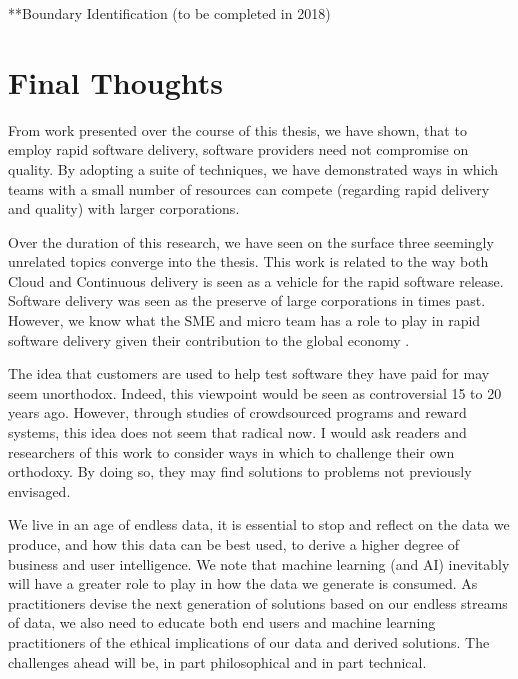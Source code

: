  **Boundary Identification (to be completed in 2018)

\section{Final Thoughts}

From work presented over the course of this thesis, we have shown, that to employ rapid software delivery, software providers need not compromise on quality. By adopting a suite of techniques, we have demonstrated ways in which teams with a small number of resources can compete (regarding rapid delivery and quality) with larger corporations. 

Over the duration of this research, we have seen on the surface three seemingly unrelated topics converge into the thesis. This work is related to the way both Cloud and Continuous delivery is seen as a vehicle for the rapid software release. Software delivery was seen as the preserve of large corporations in times past. However, we know what the SME and micro team has a role to play in rapid software delivery given their contribution to the global economy \cite{WTO}.

The idea that customers are used to help test software they have paid for may seem unorthodox. Indeed, this viewpoint would be seen as controversial 15 to 20 years ago. However, through studies of crowdsourced programs and reward systems, this idea does not seem that radical now. I would ask readers and researchers of this work to consider ways in which to challenge their own orthodoxy. By doing so, they may find solutions to problems not previously envisaged.

We live in an age of endless data, it is essential to stop and reflect on the data we produce, and how this data can be best used, to derive a higher degree of business and user intelligence. We note that machine learning (and AI) inevitably will have a greater role to play in how the data we generate is consumed. As practitioners devise the next generation of solutions based on our endless streams of data, we also need to educate both end users and machine learning practitioners of the ethical implications of our data and derived solutions. The challenges ahead will be, in part philosophical and in part technical. 

